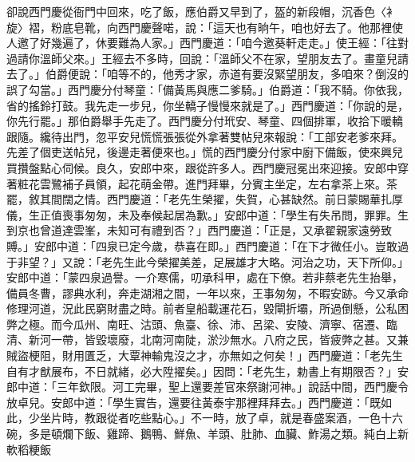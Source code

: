 卻說西門慶從衙門中回來，吃了飯，應伯爵又早到了，盔的新段帽，沉香色〈衤旋〉褶，粉底皂靴，向西門慶聲喏，說：「這天也有晌午，咱也好去了。他那裡使人邀了好幾遍了，休要難為人家。」西門慶道：「咱今邀葵軒走走。」使王經：「往對過請你溫師父來。」王經去不多時，回說：「溫師父不在家，望朋友去了。畫童兒請去了。」伯爵便說：「咱等不的，他秀才家，赤道有要沒緊望朋友，多咱來？倒沒的誤了勾當。」西門慶分付琴童：「備黃馬與應二爹騎。」伯爵道：「我不騎。你依我，省的搖鈴打鼓。我先走一步兒，你坐轎子慢慢來就是了。」西門慶道：「你說的是，你先行罷。」那伯爵舉手先走了。西門慶分付玳安、琴童、四個排軍，收拾下暖轎跟隨。纔待出門，忽平安兒慌慌張張從外拿著雙帖兒來報說：「工部安老爹來拜。先差了個吏送帖兒，後邊走著便來也。」慌的西門慶分付家中廚下備飯，使來興兒買攢盤點心伺候。良久，安郎中來，跟從許多人。西門慶冠冕出來迎接。安郎中穿著粧花雲鷺補子員領，起花萌金帶。進門拜畢，分賓主坐定，左右拿茶上來。茶罷，敘其間闊之情。西門慶道：「老先生榮擢，失賀，心甚缺然。前日蒙賜華扎厚儀，生正值喪事匆匆，未及奉候起居為歉。」安郎中道：「學生有失吊問，罪罪。生到京也曾道達雲峯，未知可有禮到否？」西門慶道：「正是，又承翟親家遠勞致賻。」安郎中道：「四泉已定今歲，恭喜在即。」西門慶道：「在下才微任小。豈敢過于非望？」又說：「老先生此今榮擢美差，足展雄才大略。河治之功，天下所仰。」安郎中道：「蒙四泉過譽。一介寒儒，叨承科甲，處在下僚。若非蔡老先生抬舉，備員冬曹，謬典水利，奔走湖湘之間，一年以來，王事匆匆，不暇安跡。今又承命修理河道，況此民窮財盡之時。前者皇船載運花石，毀閘折壩，所過倒懸，公私困弊之極。而今瓜州、南旺、沽頭、魚臺、徐、沛、呂梁、安陵、濟寧、宿遷、臨清、新河一帶，皆毀壞廢，北南河南陡，淤沙無水。八府之民，皆疲弊之甚。又兼賊盜梗阻，財用匱乏，大覃神輸鬼沒之才，亦無如之何矣！」西門慶道：「老先生自有才猷展布，不日就緒，必大陞擢矣。」因問：「老先生，勅書上有期限否？」安郎中道：「三年欽限。河工完畢，聖上還要差官來祭謝河神。」說話中間，西門慶令放卓兒。安郎中道：「學生實告，還要往黃泰宇那裡拜拜去。」西門慶道：「既如此，少坐片時，教跟從者吃些點心。」不一時，放了卓，就是春盛案酒，一色十六碗，多是頓爛下飯、雞蹄、鵝鴨、鮮魚、羊頭、肚肺、血臟、鮓湯之類。純白上新軟稻粳飯 